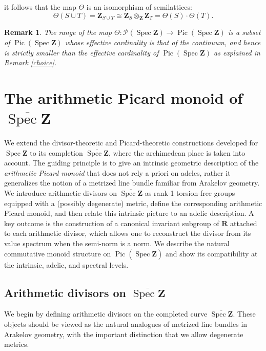 \documentclass[11pt,a4paper]{article}
\newcommand{\Z}{\mathbf{Z}}
\newcommand{\R}{\mathbf{R}}
\def\spz{\Spec \Z}
\def\spzb{\overline{\Spec \Z}}
\newcommand{\Spec}{\operatorname{Spec}}
\def\Pic{\operatorname{Pic}}
\def\spz{\Spec \Z}
\theoremstyle{plain}
\newtheorem{rem}[thm]{Remark}
\theoremstyle{definition} %
\begin{document}
it follows that the map $\Theta$ is an isomorphism of semilattices:
\[
\Theta(S \cup T) = \Z_{S \cup T} \cong \Z_S \otimes_\Z \Z_T = \Theta(S) \cdot \Theta(T).
\]

\begin{rem} The range of the  map $\Theta: \mathcal{P}(\spz) \to  \Pic(\spz)$ is a subset of $\Pic(\spz)$ whose effective cardinality is that of the continuum, and hence is strictly smaller than the effective cardinality of $\Pic(\spz)$ as explained in Remark \ref{choice}.
\end{rem}





\section{The arithmetic Picard monoid of $\spzb$}\label{extended}

We extend the divisor-theoretic and Picard-theoretic constructions
developed for $\spz$ to its completion $\spzb$, where the archimedean place is taken
into account.
The guiding principle is to give an intrinsic geometric description of the \emph{arithmetic
Picard monoid} that does not rely a priori on adeles, rather it generalizes the
notion of a metrized line bundle familiar from Arakelov geometry.
We introduce arithmetic divisors on $\spzb$ as rank-1 torsion-free groups equipped
with a (possibly degenerate) metric, define the corresponding arithmetic Picard
monoid, and then relate this intrinsic picture to an adelic description.
A key outcome is the construction of a canonical invariant subgroup of $\R$ attached
to each arithmetic divisor, which allows one to reconstruct the divisor from its
value spectrum when the semi-norm is a norm.
We describe the natural commutative monoid structure on $\Pic(\spzb)$ and
show its compatibility at the intrinsic, adelic, and spectral levels.



\subsection{Arithmetic divisors on $\spzb$}

We begin by defining arithmetic divisors on the completed curve $\spzb$.
These objects should be viewed as the natural analogues of metrized line bundles in
Arakelov geometry, with the important distinction that we allow degenerate metrics.
\end{document}
